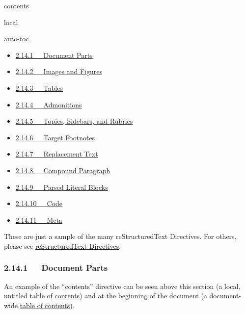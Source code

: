 \documentclass[a4paper]{article}
\begin{document}
\begin{DUclass}{contents}
\begin{DUclass}{local}

\begin{DUclass}{auto-toc}
\begin{itemize}
\item \hyperref[document-parts]{2.14.1   Document Parts}

\item \hyperref[images-and-figures]{2.14.2   Images and Figures}

\item \hyperref[tables]{2.14.3   Tables}

\item \hyperref[admonitions]{2.14.4   Admonitions}

\item \hyperref[topics-sidebars-and-rubrics]{2.14.5   Topics, Sidebars, and Rubrics}

\item \hyperref[target-footnotes]{2.14.6   Target Footnotes}

\item \hyperref[replacement-text]{2.14.7   Replacement Text}

\item \hyperref[compound-paragraph]{2.14.8   Compound Paragraph}

\item \hyperref[parsed-literal-blocks]{2.14.9   Parsed Literal Blocks}

\item \hyperref[code]{2.14.10   Code}

\item \hyperref[meta]{2.14.11   Meta}
\end{itemize}
\end{DUclass}
\end{DUclass}
\end{DUclass}

These are just a sample of the many reStructuredText Directives.  For
others, please see \href{https://docutils.sourceforge.io/docs/ref/rst/directives.html}{reStructuredText Directives}.


\subsubsection{2.14.1   Document Parts%
  \label{document-parts}%
}

An example of the “contents” directive can be seen above this section
(a local, untitled table of \hyperref[contents]{contents}) and at the beginning of the
document (a document-wide \hyperref[table-of-contents]{table of contents}).
\end{document}
